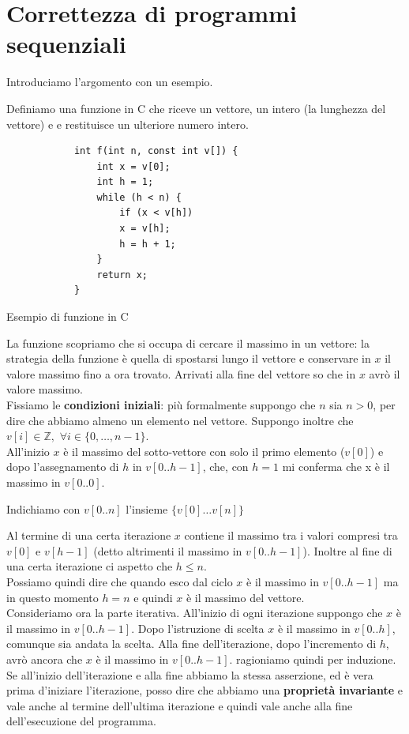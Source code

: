 \chapter{Correttezza di programmi sequenziali}
\label{Capitolo 3}
Introduciamo l'argomento con un esempio.
\begin{esempio}
	Definiamo una funzione in C che riceve un vettore, un intero (la lunghezza del vettore) e
	e restituisce un ulteriore numero intero.
	\begin{listing}[ht]
		\begin{verbatim}
			int f(int n, const int v[]) {
				int x = v[0];
				int h = 1;
				while (h < n) {
					if (x < v[h])
					x = v[h];        
					h = h + 1;
				}
				return x;
			}
		\end{verbatim}
		\caption{Esempio di funzione in C}
		\label{listing:1}
	\end{listing}
	La funzione scopriamo che si occupa di cercare il massimo in
	un vettore: la strategia della funzione è quella di spostarsi lungo il vettore e
	conservare in $x$ il valore massimo fino a ora trovato. Arrivati alla fine
	del vettore so che in $x$ avrò il valore massimo.\\
	Fissiamo le \textbf{condizioni iniziali}: più formalmente suppongo che $n$ sia $n > 0$, per dire che abbiamo almeno un
	elemento nel vettore. Suppongo inoltre che $v[i]\in\mathbb{Z},\,\,\forall i\in
	\{0,\ldots, n-1\}$. \\
	All'inizio $x$ è il massimo del sotto-vettore con solo il primo elemento
	($v[0]$) e dopo l'assegnamento di $h$ in $v[0..h-1]$, che, con $h=1$ mi
	conferma che x è il massimo in $v[0..0]$. \\
	\begin{nota}
	Indichiamo con $v[0..n]$ l'insieme $\{v[0] \dots v[n]\}$ 
	\end{nota}
	Al termine di una certa iterazione $x$ contiene il massimo 
	tra i valori compresi tra $v[0]$ e $v[h-1]$ (detto altrimenti il massimo in
	$v[0..h-1]$). Inoltre al fine di una certa iterazione ci aspetto che $h\leq
	n$.\\
	Possiamo quindi dire che quando esco dal ciclo $x$ è il massimo in $v[0..h-1]$
	ma in questo momento $h=n$ e quindi $x$ è il massimo del vettore.\\
	Consideriamo ora la parte iterativa. All'inizio di ogni iterazione suppongo
	che $x$ è il massimo in $v[0..h-1]$. Dopo l'istruzione di scelta $x$ è il
	massimo in $v[0..h]$, comunque sia andata la scelta. Alla fine
	dell'iterazione, dopo l'incremento di $h$, avrò ancora che $x$ è il massimo in
	$v[0..h-1]$. ragioniamo quindi per induzione. Se all'inizio dell'iterazione e
	alla fine abbiamo la stessa asserzione, ed è vera prima d'iniziare l'iterazione,
	posso dire che abbiamo una \textbf{proprietà invariante} e vale anche al termine
	dell'ultima iterazione e quindi vale anche alla fine dell'esecuzione del
	programma. 
\end{esempio}
